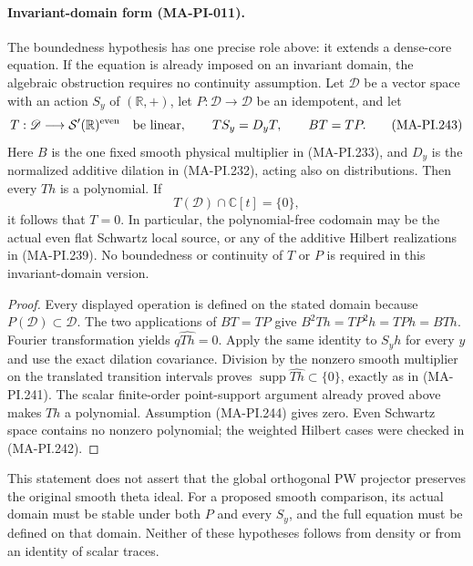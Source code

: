 \paragraph{Invariant-domain form (MA-PI-011).}
The boundedness hypothesis has one precise role above:
it extends a dense-core equation. If the equation is
already imposed on an invariant domain, the algebraic
obstruction requires no continuity assumption.
Let $\mathscr D$ be a vector space with an action
$S_y$ of $(\mathbb R,+)$, let $P:\mathscr D\to\mathscr D$
be an idempotent, and let
\[
 T:\mathscr D\longrightarrow\mathcal S'(\mathbb R)^{\rm even}
 \quad\hbox{be linear},\qquad
 T S_y=D_yT,\qquad BT=TP.
 \tag{MA-PI.243}
\]
Here $B$ is the one fixed smooth physical multiplier
in (MA-PI.233), and $D_y$ is the normalized additive
dilation in (MA-PI.232), acting also on distributions.
Then every $Th$ is a polynomial. If
\[
             T(\mathscr D)\cap\mathbb C[t]=\{0\},
 \tag{MA-PI.244}
\]
it follows that $T=0$. In particular, the polynomial-free
codomain may be the actual even flat Schwartz local
source, or any of the additive Hilbert realizations in
(MA-PI.239). No boundedness or continuity of $T$ or $P$
is required in this invariant-domain version.

\begin{proof}
Every displayed operation is defined on the stated
domain because $P(\mathscr D)\subset\mathscr D$.
The two applications of $BT=TP$ give
$B^2Th=TP^2h=TPh=BTh$. Fourier transformation yields
$q\widehat{Th}=0$. Apply the same identity to $S_yh$
for every $y$ and use the exact dilation covariance.
Division by the nonzero smooth multiplier on the
translated transition intervals proves
$\operatorname{supp}\widehat{Th}\subset\{0\}$,
exactly as in (MA-PI.241). The scalar finite-order
point-support argument already proved above makes $Th$
a polynomial. Assumption (MA-PI.244) gives zero.
Even Schwartz space contains no nonzero polynomial;
the weighted Hilbert cases were checked in (MA-PI.242).
\end{proof}

This statement does not assert that the global orthogonal
PW projector preserves the original smooth theta ideal.
For a proposed smooth comparison, its actual domain
must be stable under both $P$ and every $S_y$, and the
full equation must be defined on that domain. Neither
of these hypotheses follows from density or from an
identity of scalar traces.

